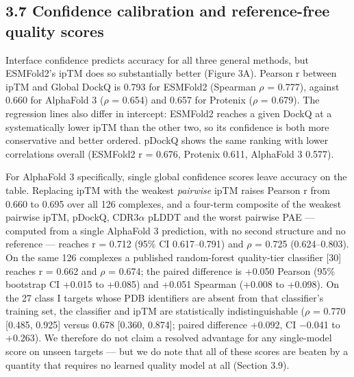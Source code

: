 \documentclass[
  11pt,
]{article}
\begin{document}
\subsection{3.7 Confidence calibration and reference-free quality
scores}\label{confidence-calibration-and-reference-free-quality-scores}

Interface confidence predicts accuracy for all three general methods,
but ESMFold2's ipTM does so substantially better (Figure 3A). Pearson r
between ipTM and Global DockQ is 0.793 for ESMFold2 (Spearman \ensuremath{\rho} =
0.777), against 0.660 for AlphaFold 3 (\ensuremath{\rho} = 0.654) and 0.657 for Protenix
(\ensuremath{\rho} = 0.679). The regression lines also differ in intercept: ESMFold2
reaches a given DockQ at a systematically lower ipTM than the other two,
so its confidence is both more conservative and better ordered. pDockQ
shows the same ranking with lower correlations overall (ESMFold2 r =
0.676, Protenix 0.611, AlphaFold 3 0.577).

For AlphaFold 3 specifically, single global confidence scores leave
accuracy on the table. Replacing ipTM with the weakest \emph{pairwise}
ipTM raises Pearson r from 0.660 to 0.695 over all 126 complexes, and a
four-term composite of the weakest pairwise ipTM, pDockQ, CDR3\ensuremath{\alpha} pLDDT
and the worst pairwise PAE --- computed from a single AlphaFold 3
prediction, with no second structure and no reference --- reaches r =
0.712 (95\% CI 0.617--0.791) and \ensuremath{\rho} = 0.725 (0.624--0.803). On the same
126 complexes a published random-forest quality-tier classifier {[}30{]}
reaches r = 0.662 and \ensuremath{\rho} = 0.674; the paired difference is +0.050 Pearson
(95\% bootstrap CI +0.015 to +0.085) and +0.051 Spearman (+0.008 to
+0.098). On the 27 class I targets whose PDB identifiers are absent from
that classifier's training set, the classifier and ipTM are
statistically indistinguishable (\ensuremath{\rho} = 0.770 {[}0.485, 0.925{]} versus
0.678 {[}0.360, 0.874{]}; paired difference +0.092, CI \ensuremath{-}0.041 to
+0.263). We therefore do not claim a resolved advantage for any
single-model score on unseen targets --- but we do note that all of
these scores are beaten by a quantity that requires no learned quality
model at all (Section 3.9).
\end{document}
